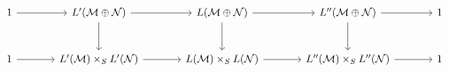 \[\begin{tikzcd}[column sep=large,row sep=large]
1 \arrow[r] & L'(\mathcal M\oplus\mathcal N) \arrow[r] \arrow[d] & L(\mathcal M\oplus\mathcal N) \arrow[r] \arrow[d] & L''(\mathcal M\oplus\mathcal N) \arrow[r] \arrow[d] & 1\\
1 \arrow[r] & L'(\mathcal M)\times_S L'(\mathcal N) \arrow[r] & L(\mathcal M)\times_S L(\mathcal N) \arrow[r] & L''(\mathcal M)\times_S L''(\mathcal N) \arrow[r] & 1
\end{tikzcd}\]
